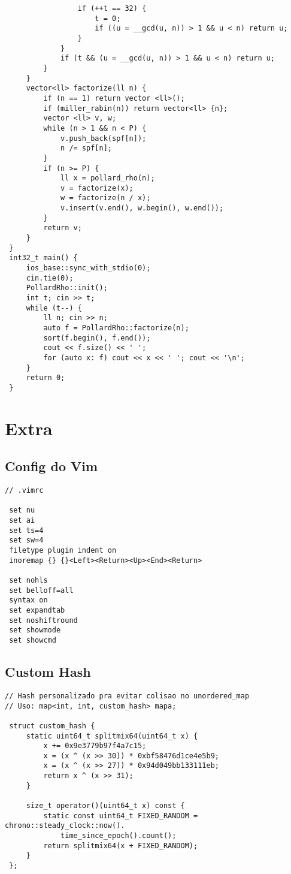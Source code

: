 \documentclass[11pt, a4paper, twoside]{article}
\begin{document}
\begin{lstlisting}
                 if (++t == 32) {
                     t = 0;
                     if ((u = __gcd(u, n)) > 1 && u < n) return u;
                 }
             }
             if (t && (u = __gcd(u, n)) > 1 && u < n) return u;
         }
     }
     vector<ll> factorize(ll n) {
         if (n == 1) return vector <ll>();
         if (miller_rabin(n)) return vector<ll> {n};
         vector <ll> v, w;
         while (n > 1 && n < P) {
             v.push_back(spf[n]);
             n /= spf[n];
         }
         if (n >= P) {
             ll x = pollard_rho(n);
             v = factorize(x);
             w = factorize(n / x);
             v.insert(v.end(), w.begin(), w.end());
         }
         return v;
     }
 }
 int32_t main() {
     ios_base::sync_with_stdio(0);
     cin.tie(0);
     PollardRho::init();
     int t; cin >> t;
     while (t--) {
         ll n; cin >> n;
         auto f = PollardRho::factorize(n);
         sort(f.begin(), f.end());
         cout << f.size() << ' '; 
         for (auto x: f) cout << x << ' '; cout << '\n';
     }
     return 0;
 }
\end{lstlisting}

\pagebreak


%
%

\section{Extra}

\subsection{Config do Vim}
\begin{lstlisting}
// .vimrc

 set nu
 set ai
 set ts=4
 set sw=4
 filetype plugin indent on
 inoremap {} {}<Left><Return><Up><End><Return> 
 
 set nohls
 set belloff=all
 syntax on
 set expandtab
 set noshiftround
 set showmode
 set showcmd
\end{lstlisting}

\subsection{Custom Hash}
\begin{lstlisting}
// Hash personalizado pra evitar colisao no unordered_map
// Uso: map<int, int, custom_hash> mapa;

 struct custom_hash {
     static uint64_t splitmix64(uint64_t x) {
         x += 0x9e3779b97f4a7c15;
         x = (x ^ (x >> 30)) * 0xbf58476d1ce4e5b9;
         x = (x ^ (x >> 27)) * 0x94d049bb133111eb;
         return x ^ (x >> 31);
     }
  
     size_t operator()(uint64_t x) const {
         static const uint64_t FIXED_RANDOM = chrono::steady_clock::now().
             time_since_epoch().count();
         return splitmix64(x + FIXED_RANDOM);
     }
 };
\end{lstlisting}
\end{document}
